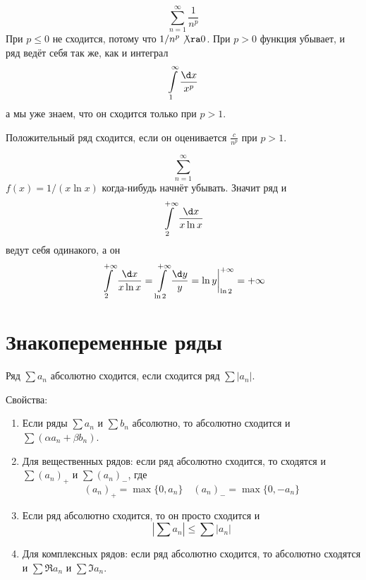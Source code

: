 \begin{exmp}
	\[ \sum_{n=1}^\infty \frac1{n^p} \]
	При $p \le 0$ не сходится, потому что $1/n^p \not\ra 0$.
	При $p > 0$ функция убывает, и ряд ведёт себя так же, как и интеграл
	\[ \int\limits_1^\infty \frac{\d x}{x^p} \]
	а мы уже знаем, что он сходится только при $p > 1$.
\end{exmp}

\begin{conseq}
	Положительный ряд сходится, если он оценивается $\frac{c}{n^p}$ при $p > 1$.
\end{conseq}

\begin{conseq}
	\[ \sum_{n=1}^\infty \]
	$f(x) = 1/(x \ln x)$ когда-нибудь начнёт убывать.
	Значит ряд и
	\[ \int\limits_2^{+\infty} \frac{\d x}{x \ln x} \]
	ведут себя одинакого, а он
	\[ \int\limits_2^{+\infty} \frac{\d x}{x \ln x} = \int\limits_{\ln 2}^{+\infty} \frac{\d y}y = \ln y \biggr|_{\ln 2}^{+\infty} = +\infty \]
\end{conseq}

\section{Знакопеременные ряды}

\begin{Def}
	Ряд $\sum a_n$ абсолютно сходится, если сходится ряд $\sum |a_n|$.
\end{Def}

Свойства:
\begin{enumerate}
\item
	Если ряды $\sum a_n$ и $\sum b_n$ абсолютно, то абсолютно сходится и $\sum (\alpha a_n + \beta b_n)$.

\item
	Для вещественных рядов: если ряд абсолютно сходится, то сходятся и $\sum (a_n)_+$ и $\sum (a_n)_-$, где
	\[ (a_n)_+ = \max \{0, a_n\} \quad (a_n)_- = \max \{0, -a_n\} \]

\item
	Если ряд абсолютно сходится, то он просто сходится и
	\[ \left| \sum a_n \right| \le \sum |a_n| \]

\item
	Для комплексных рядов: если ряд абсолютно сходится, то абсолютно сходятся и $\sum \Re a_n$ и $\sum \Im a_n$.
\end{enumerate}

